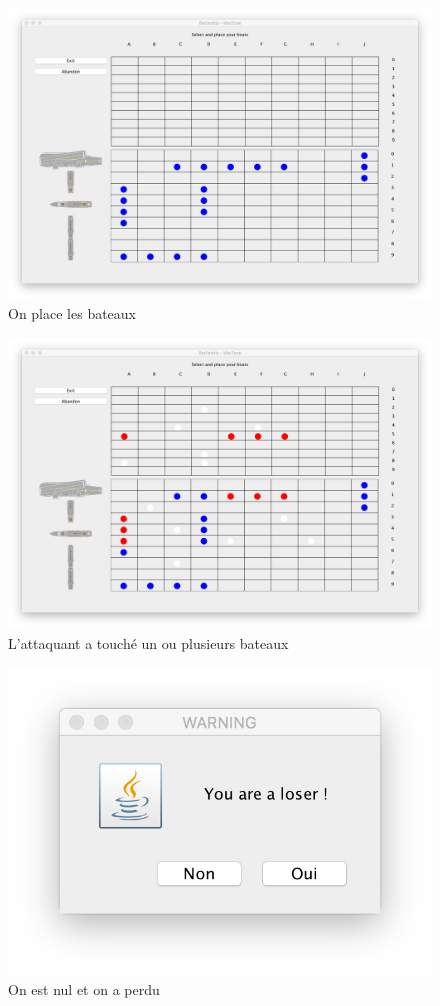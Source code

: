 \documentclass[a4paper,10pt]{article}
\begin{document}
\begin{figure}[H]
    \center
    \includegraphics[scale=0.35]{images/placeboat}
    \caption{On place les bateaux}
    \label{fig:my_label}
\end{figure}

\begin{figure}[H]
    \center
    \includegraphics[scale=0.35]{images/touched}
    \caption{L'attaquant a touché un ou plusieurs bateaux}
    \label{fig:my_label}
\end{figure}

\begin{figure}[H]
    \center
    \includegraphics[scale=0.45]{images/loser}
    \caption{On est nul et on a perdu}
    \label{fig:my_label}
\end{figure}

\newpage
\end{document}
